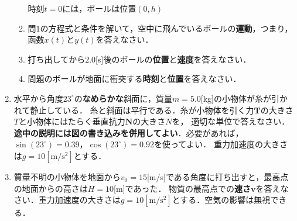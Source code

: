 \documentclass[a4paper,11pt]{ltjsarticle}
\begin{document}
\begin{enumerate}
\begin{enumerate}[label=(\arabic*)]
        時刻$t=0$には，ボールは位置$(0,h)$

        \vspace{5pt}

        \item 問1の方程式と条件を解いて，空中に飛んでいるボールの\textbf{運動}，つまり，函数$x(t)$と$y(t)$を答えなさい．
        
        \vspace{50pt}

        \item 打ち出してから$2.0$[s]後のボールの\textbf{位置}と\textbf{速度}を答えなさい．

        \vspace{50pt}

        \item 問題のボールが地面に衝突する\textbf{時刻}と\textbf{位置}を答えなさい．
    \end{enumerate}

\clearpage

    \item 水平から角度$23^\circ$の\textbf{なめらかな}斜面に，質量$m=5.0$[kg]の小物体が糸が引かれて静止している．
    糸と斜面は平行である．糸が小物体を引く力$\bm{T}$の大きさ$T$と小物体にはたらく垂直抗力$\bm{N}$の大きさ$N$を，
    適切な単位で答えなさい．\textbf{途中の説明には図の書き込みを併用してよい}．必要があれば，$\sin(23^\circ)=0.39$，$\cos(23^\circ)=0.92$を使ってよい．
    重力加速度の大きさは$g=10[\mathrm{m/s^2}]$とする．

    \begin{center}
        \end{center}

\clearpage

    \item 質量不明の小物体を地面から$v_0=15$[m/s]である角度に打ち出すと，最高点の地面からの高さは$H=10$[m]であった．
    物質の最高点での\textbf{速さ}$\bm{v}$を答えなさい．重力加速度の大きさは$g=10[\mathrm{m/s^2}]$とする．空気の影響は無視できる．


\end{enumerate}
\end{document}
